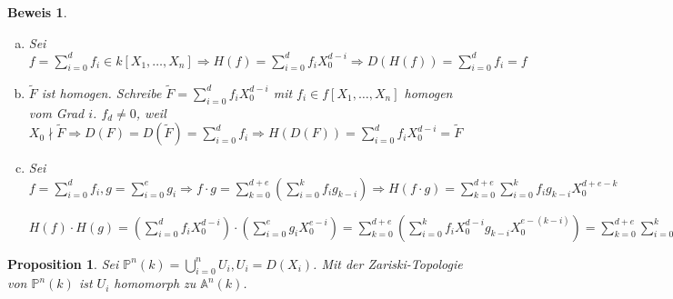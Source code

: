 \documentclass[a4paper, 12pt, numbers=noendperiod, chapterprefix=true]{scrbook}
\theoremstyle{break}
\newtheorem{Prop}[Def]{Proposition}
\theoremstyle{nonumberbreak}
\newtheorem{Bew}{Beweis}
\theoremstyle{nonumberplain}
\newcommand{\Sum}{\sum\limits}
\newcommand{\A}{\mathbb{A}}
\newcommand{\IP}{\mathbb{P}}%
\begin{document}
\begin{Bew}\begin{enumerate}[a)]
\item[c)]
	Sei $f=\Sum_{i=0}^df_i\in k[X_1,\ldots ,X_n] \Rightarrow H(f)=\Sum_{i=0}^df_iX_0^{d-i} \Rightarrow D(H(f))=\Sum_{i=0}^df_i=f$
\item[d)]
	$\widetilde F$ ist homogen. Schreibe $\widetilde F=\Sum_{i=0}^df_iX_0^{d-i}$ mit $f_i\in f[X_1,\ldots ,X_n]$ homogen vom Grad $i$. $f_d\ne0$, weil $X_0\nmid \widetilde F \Rightarrow D(F)=D(\widetilde F)=\Sum_{i=0}^df_i \Rightarrow H(D(F))=\Sum_{i=0}^df_iX_0^{d-i}=\widetilde F$
\item[e)]
	Sei $f=\Sum_{i=0}^df_i, g= \Sum_{i=0}^eg_i \Rightarrow f\cdot g=\Sum_{k=0}^{d+e}(\Sum_{i=0}^kf_ig_{k-i}) \Rightarrow H(f\cdot g)=\Sum_{k=0}^{d+e}\Sum_{i=0}^kf_ig_{k-i}X_0^{d+e-k}$
	
	$H(f)\cdot H(g)=(\Sum_{i=0}^df_iX_0^{d-i})\cdot(\Sum_{i=0}^eg_iX_0^{e-i}) = \Sum_{k=0}^{d+e}(\Sum_{i=0}^kf_iX_0^{d-i}g_{k-i}X_0^{e-(k-i)})=\Sum_{k=0}^{d+e}\Sum_{i=0}^kf_ig_{k-i}X_0^{d+e-k}$
\end{enumerate}\end{Bew}

\begin{Prop}
Sei $\IP^n(k)=\bigcup\limits_{i=0}^nU_i, U_i=D(X_i)$. Mit der Zariski-Topologie von $\IP^n(k)$ ist $U_i$ homomorph zu $\A^n(k)$.
\end{Prop}
\end{document}
